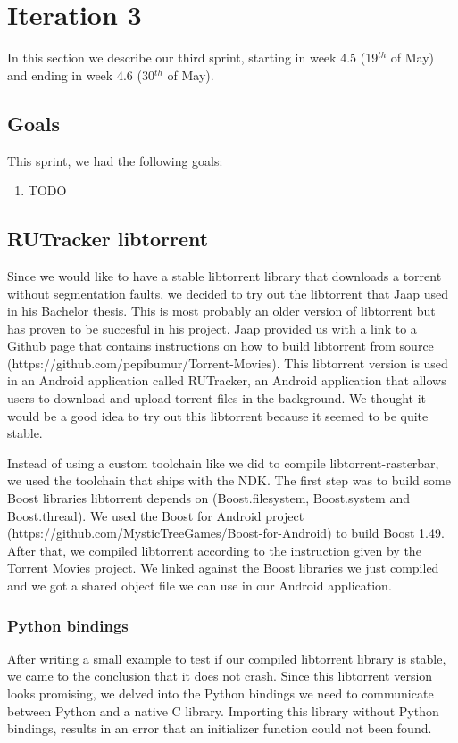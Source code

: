 \section{Iteration 3}
\label{iteration2}
	In this section we describe our third sprint, starting in week 4.5 (19$^{th}$ of May) and ending in week 4.6 (30$^{th}$ of May).

	\subsection{Goals}
		This sprint, we had the following goals:
	
		\begin{enumerate}
			\item TODO
		\end{enumerate}
		
	\subsection{RUTracker libtorrent}
		Since we would like to have a stable libtorrent library that downloads a torrent without segmentation faults, we decided to try out the libtorrent that Jaap used in his Bachelor thesis. This is most probably an older version of libtorrent but has proven to be succesful in his project. Jaap provided us with a link to a Github page that contains instructions on how to build libtorrent from source (https://github.com/pepibumur/Torrent-Movies). This libtorrent version is used in an Android application called RUTracker, an Android application that allows users to download and upload torrent files in the background. We thought it would be a good idea to try out this libtorrent because it seemed to be quite stable.
		
		Instead of using a custom toolchain like we did to compile libtorrent-rasterbar, we used the toolchain that ships with the NDK. The first step was to build some Boost libraries libtorrent depends on (Boost.filesystem, Boost.system and Boost.thread). We used the Boost for Android project (https://github.com/MysticTreeGames/Boost-for-Android) to build Boost 1.49. After that, we compiled libtorrent according to the instruction given by the Torrent Movies project. We linked against the Boost libraries we just compiled and we got a shared object file we can use in our Android application.
		
			\subsubsection{Python bindings}
				After writing a small example to test if our compiled libtorrent library is stable, we came to the conclusion that it does not crash. Since this libtorrent version looks promising, we delved into the Python bindings we need to communicate between Python and a native C library. Importing this library without Python bindings, results in an error that an initializer function could not been found.
		
